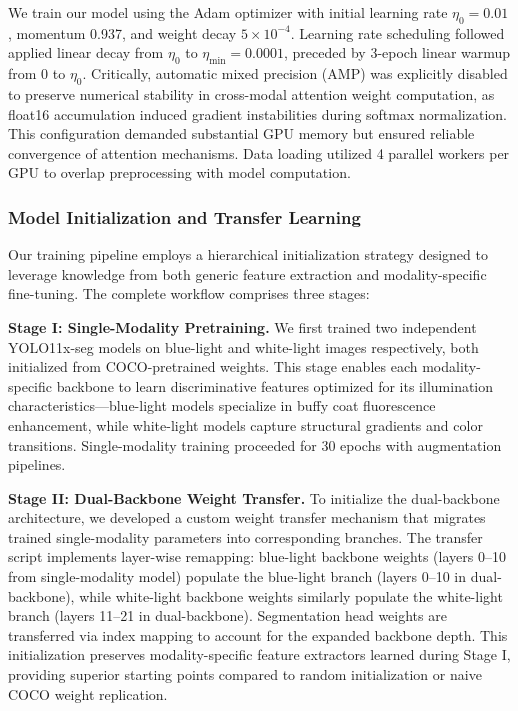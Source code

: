 \documentclass[journal,twoside,web]{ieeecolor}
\begin{document}
We train our model using the Adam optimizer with initial learning rate $\eta_0 = 0.01$, momentum 0.937, and weight decay $5 \times 10^{-4}$. Learning rate scheduling followed applied linear decay from $\eta_0$ to $\eta_{\text{min}} = 0.0001$, preceded by 3-epoch linear warmup from 0 to $\eta_0$. Critically, automatic mixed precision (AMP) was explicitly disabled to preserve numerical stability in cross-modal attention weight computation, as float16 accumulation induced gradient instabilities during softmax normalization. This configuration demanded substantial GPU memory but ensured reliable convergence of attention mechanisms. Data loading utilized 4 parallel workers per GPU to overlap preprocessing with model computation.

\subsubsection{Model Initialization and Transfer Learning} Our training pipeline employs a hierarchical initialization strategy designed to leverage knowledge from both generic feature extraction and modality-specific fine-tuning. The complete workflow comprises three stages:

\textbf{Stage I: Single-Modality Pretraining.} We first trained two independent YOLO11x-seg models on blue-light and white-light images respectively, both initialized from COCO-pretrained weights. This stage enables each modality-specific backbone to learn discriminative features optimized for its illumination characteristics—blue-light models specialize in buffy coat fluorescence enhancement, while white-light models capture structural gradients and color transitions. Single-modality training proceeded for 30 epochs with augmentation pipelines.

\textbf{Stage II: Dual-Backbone Weight Transfer.} To initialize the dual-backbone architecture, we developed a custom weight transfer mechanism that migrates trained single-modality parameters into corresponding branches. The transfer script implements layer-wise remapping: blue-light backbone weights (layers 0--10 from single-modality model) populate the blue-light branch (layers 0--10 in dual-backbone), while white-light backbone weights similarly populate the white-light branch (layers 11--21 in dual-backbone). Segmentation head weights are transferred via index mapping to account for the expanded backbone depth. This initialization preserves modality-specific feature extractors learned during Stage I, providing superior starting points compared to random initialization or naive COCO weight replication.
\end{document}
